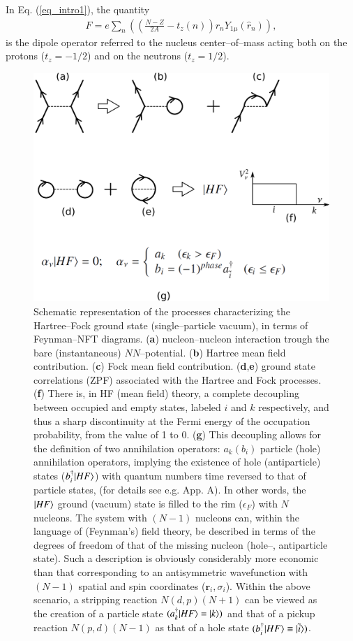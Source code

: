In Eq. (\ref{eq_intro1}), the quantity 
\begin{align}\label{eq1.2.4}
F=e\sum_n\left(\left(\frac{N-Z}{2A}-t_z(n)\right)r_nY_{1\mu}(\hat r_n)\right),
\end{align}
is the dipole operator referred to the nucleus center--of--mass acting both on the  protons ($t_z=-1/2$) and on the neutrons ($t_z=1/2$). 
\begin{figure}
\centerline {
\includegraphics*[width=12cm]{introduccion/figs/figintro4}
}
\caption{Schematic representation of the processes characterizing the Hartree--Fock ground state (single--particle vacuum), in terms of Feynman--NFT diagrams. (\textbf{a}) nucleon--nucleon interaction trough the bare (instantaneous) $NN$--potential. (\textbf{b}) Hartree mean field contribution. (\textbf{c}) Fock mean field contribution. (\textbf{d},\textbf{e}) ground state correlations (ZPF) associated with the Hartree and Fock processes. (\textbf{f}) There is, in HF (mean field) theory, a complete decoupling between occupied and empty states, labeled $i$ and $k$ respectively, and thus a sharp discontinuity at the Fermi energy of the occupation probability, from the value of 1 to 0. (\textbf{g}) This decoupling allows for the definition of two annihilation operators: $a_k(b_i)$ particle (hole) annihilation operators,   implying the existence of hole (antiparticle) states ($b^\dagger_i|{HF} \rangle$) with quantum numbers time reversed to that of particle states, (for details see e.g. \cite{Brink:05} App. A). In other words, the $|{HF} \rangle$ ground (vacuum) state is filled to the rim ($\epsilon_F$) with $N$ nucleons. The system with $(N-1)$ nucleons can, within the language of (Feynman's) field theory, be described in terms of the degrees of freedom of that of the missing nucleon (hole--, antiparticle state). Such a description is obviously considerably more economic than that corresponding to an antisymmetric wavefunction with $(N-1)$ spatial and spin coordinates ($\mathbf r_i,\sigma_i$). Within the above scenario, a stripping reaction $N(d,p)(N+1)$ can be viewed as the creation of a particle state $(a^\dagger_k|{HF} \rangle=|{k} \rangle)$ and that of a pickup reaction $N(p,d)(N-1)$ as that of a hole state $(b^\dagger_i|{HF} \rangle\equiv|{\tilde i} \rangle)$.}
\label{figintro4}
\end{figure}

